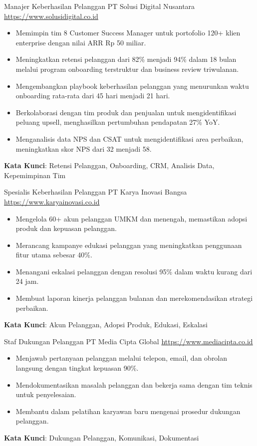 \documentclass[a4paper, serif, 10pt]{moderncv}
\begin{document}
        {Manajer Keberhasilan Pelanggan}
        {PT Solusi Digital Nusantara}
        {\url{https://www.solusidigital.co.id}}
        {}
        {\begin{itemize}
\item Memimpin tim 8 Customer Success Manager untuk portofolio 120+ klien enterprise dengan nilai ARR Rp 50 miliar.
\item Meningkatkan retensi pelanggan dari 82\% menjadi 94\% dalam 18 bulan melalui program onboarding terstruktur dan business review triwulanan.
\item Mengembangkan playbook keberhasilan pelanggan yang menurunkan waktu onboarding rata-rata dari 45 hari menjadi 21 hari.
\item Berkolaborasi dengan tim produk dan penjualan untuk mengidentifikasi peluang upsell, menghasilkan pertumbuhan pendapatan 27\% YoY.
\item Menganalisis data NPS dan CSAT untuk mengidentifikasi area perbaikan, meningkatkan skor NPS dari 32 menjadi 58.
\end{itemize}
\textbf{Kata Kunci}: Retensi Pelanggan, Onboarding, CRM, Analisis Data, Kepemimpinan Tim}

        {Spesialis Keberhasilan Pelanggan}
        {PT Karya Inovasi Bangsa}
        {\url{https://www.karyainovasi.co.id}}
        {}
        {\begin{itemize}
\item Mengelola 60+ akun pelanggan UMKM dan menengah, memastikan adopsi produk dan kepuasan pelanggan.
\item Merancang kampanye edukasi pelanggan yang meningkatkan penggunaan fitur utama sebesar 40\%.
\item Menangani eskalasi pelanggan dengan resolusi 95\% dalam waktu kurang dari 24 jam.
\item Membuat laporan kinerja pelanggan bulanan dan merekomendasikan strategi perbaikan.
\end{itemize}
\textbf{Kata Kunci}: Akun Pelanggan, Adopsi Produk, Edukasi, Eskalasi}

        {Staf Dukungan Pelanggan}
        {PT Media Cipta Global}
        {\url{https://www.mediacipta.co.id}}
        {}
        {\begin{itemize}
\item Menjawab pertanyaan pelanggan melalui telepon, email, dan obrolan langsung dengan tingkat kepuasan 90\%.
\item Mendokumentasikan masalah pelanggan dan bekerja sama dengan tim teknis untuk penyelesaian.
\item Membantu dalam pelatihan karyawan baru mengenai prosedur dukungan pelanggan.
\end{itemize}
\textbf{Kata Kunci}: Dukungan Pelanggan, Komunikasi, Dokumentasi}
\end{document}
